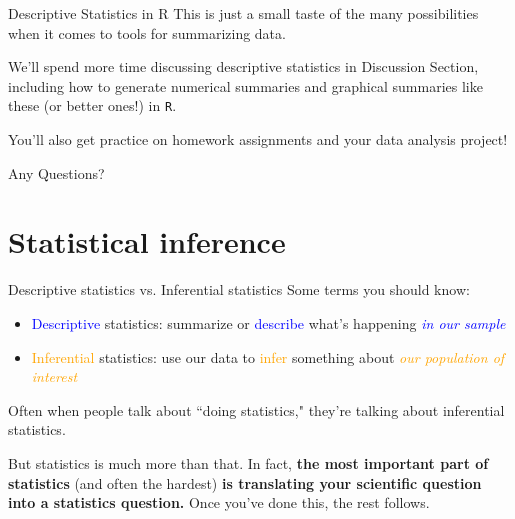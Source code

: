 \documentclass[10pt,t]{beamer}
\begin{document}
\begin{frame}{Descriptive Statistics in R}
This is just a small taste of the many possibilities when it comes to tools for summarizing data.

\vspace{0.3cm}

We’ll spend more time discussing descriptive statistics in Discussion Section, including how to generate numerical summaries and graphical summaries like these (or better ones!) in \texttt{R}.

\vspace{0.3cm}

You’ll also get practice on homework assignments and your data analysis project!

\end{frame}

\begin{frame}[c]
\centering \huge Any Questions?
\end{frame}

\section{Statistical inference}

\begin{frame}{Descriptive statistics vs. Inferential statistics}
Some terms you should know:

\vspace{0.3cm}

\begin{itemize}
	\item \textcolor{blue}{Descriptive} statistics: summarize or \textcolor{blue}{describe} what's happening \textcolor{blue}{\textit{in our sample}}
	\item \textcolor{orange}{Inferential} statistics: use our data to \textcolor{orange}{infer} something about \textcolor{orange}{\textit{our population of interest}}
\end{itemize}

\vspace{0.3cm}

Often when people talk about ``doing statistics," they're talking about inferential statistics.

\vspace{0.3cm}

But statistics is much more than that. In fact, \textbf{the most important part of statistics} (and often the hardest) \textbf{is translating your scientific question into a statistics question.} Once you've done this, the rest follows.

\end{frame}
\end{document}
